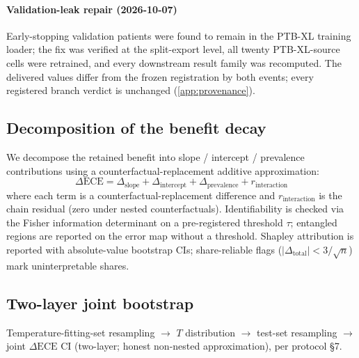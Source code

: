 \documentclass[review,12pt,nonatbib]{elsarticle}
\begin{document}
\paragraph{Validation-leak repair (2026-10-07)} Early-stopping
validation patients were found to remain in the PTB-XL training loader;
the fix was verified at the split-export level, all twenty PTB-XL-source
cells were retrained, and every downstream result family was recomputed.
The delivered values differ from the frozen registration by both events;
every registered branch verdict is unchanged (\ref{app:provenance}).
\subsection{Decomposition of the benefit decay}
\label{sec:decomp}
We decompose the retained benefit into slope / intercept / prevalence
contributions using a counterfactual-replacement additive approximation:
\begin{equation}
    \Delta\text{ECE} = \Delta_{\text{slope}}
    + \Delta_{\text{intercept}}
    + \Delta_{\text{prevalence}}
    + r_{\text{interaction}}
\end{equation}
where each term is a counterfactual-replacement difference and
$r_{\text{interaction}}$ is the chain residual (zero under nested
counterfactuals). Identifiability is checked via the Fisher information
determinant on a pre-registered threshold $\tau$; entangled regions are
reported on the error map without a threshold. Shapley attribution is
reported with absolute-value bootstrap CIs; share-reliable flags
($|\Delta_{\text{total}}|<3/\sqrt{n}$) mark uninterpretable shares.

\subsection{Two-layer joint bootstrap}
Temperature-fitting-set resampling $\rightarrow$ $T$ distribution
$\rightarrow$ test-set resampling $\rightarrow$ joint $\Delta\text{ECE}$ CI
(two-layer; honest non-nested approximation), per protocol \S7.
\end{document}
